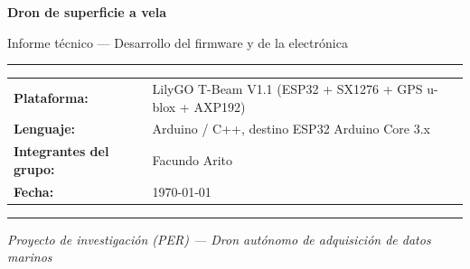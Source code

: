 \documentclass[12pt,a4paper]{article}
\begin{document}
\begin{titlepage}
  \centering
  \vspace*{2cm}
  {\Huge\bfseries Dron de superficie a vela\par}
  \vspace{0.5cm}
  {\Large Informe t\'ecnico --- Desarrollo del firmware y de la electr\'onica\par}
  \vspace{2cm}
  \rule{\linewidth}{1pt}
  \vspace{0.5cm}

  \begin{tabular}{ll}
    \textbf{Plataforma:} & LilyGO T-Beam V1.1 (ESP32 + SX1276 + GPS u-blox + AXP192) \\[4pt]
    \textbf{Lenguaje:}   & Arduino / C++, destino ESP32 Arduino Core 3.x \\[4pt]
    \textbf{Integrantes del grupo: } & Facundo Arito \\[4pt]
    \textbf{Fecha:}      & \today \\
  \end{tabular}

  \vspace{0.5cm}
  \rule{\linewidth}{1pt}
  \vspace{2cm}

  \begin{abstract}
    Este documento recorre la totalidad del desarrollo inform\'atico y electr\'onico
    del dron de superficie a vela basado en el m\'odulo T-Beam de Espressif/LilyGO.
    Cubre el concepto f\'isico del veh\'iculo, el c\'odigo original y sus limitaciones,
    la reescritura completa de la arquitectura de software, las dos revisiones del
    PCB, el modo manual unificado con propulsi\'on bidireccional, la navegaci\'on
    aut\'onoma a vela, la interfaz de estaci\'on terrena (IHM) y, de forma detallada,
    \textbf{todos los problemas} encontrados a lo largo del proyecto junto con las
    soluciones implementadas. Una secci\'on final reúne los problemas a\'un abiertos
    y las opciones de mejora propuestas para resolverlos.
  \end{abstract}

  \vfill
  \textit{Proyecto de investigaci\'on (PER) --- Dron aut\'onomo de adquisici\'on de datos marinos}
\end{titlepage}

\tableofcontents
\newpage

\end{document}
